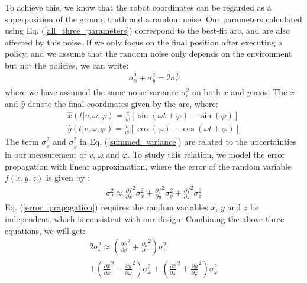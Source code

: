 To achieve this, we know that the robot coordinates can be regarded as a superposition of the ground truth and a random noise.
Our parameters calculated using Eq. (\ref{all_three_parameters}) correspond to the best-fit arc, and are also affected by this noise.
If we only focus on the final position after executing a policy, and we assume that the random noise only depends on the environment but not the policies, we can write:
%
\begin{equation}
\begin{gathered}
\sigma_{\hat{x}}^2 + \sigma_{\hat{y}}^2 = 2 \sigma_{\epsilon}^2
\end{gathered}
\label{summed_variance}
\end{equation}
%
where we have assumed the same noise variance $\sigma_{\epsilon}^2$ on both $x$ and $y$ axis.
The $\hat{x}$ and $\hat{y}$ denote the final coordinates given by the arc, where:
\begin{equation}
\begin{gathered}
\hat{x}(t | v, \omega, \varphi) 
= \frac{v}{w} \left[ \sin(\omega t + \varphi) - \sin(\varphi) \right]
\\
\hat{y}(t | v, \omega, \varphi) 
= \frac{v}{w} \left[ \cos(\varphi) - \cos(\omega t + \varphi) \right]
\end{gathered}
\label{position_from_arc}
\end{equation}
%
The term $\sigma_{\hat{x}}^2$ and $\sigma_{\hat{y}}^2$ in Eq. (\ref{summed_variance}) are related to the uncertainties in our measurement of $v$, $\omega$ and $\varphi$.
To study this relation, we model the error propagation with linear approximation, where the error of the random variable $f(x, y, z)$ is given by \cite{error_analysis}:
\begin{equation}
\begin{gathered}
\sigma_f^2 \approx
\frac{\partial f}{\partial x}^2 \sigma_x^2
+ \frac{\partial f}{\partial y}^2 \sigma_y^2
+ \frac{\partial f}{\partial z}^2 \sigma_z^2
\end{gathered}
\label{error_prapagation}
\end{equation}
Eq. (\ref{error_prapagation}) requires the random variables $x$, $y$ and $z$ be independent, which is consistent with our design.
Combining the above three equations, we will get:
\begin{equation}
\begin{gathered}
2\sigma_{\epsilon}^2 \approx 
\left(
 \frac{\partial \hat{x}}{\partial v}^2
 + \frac{\partial \hat{y}}{\partial v}^2
\right) \sigma_v^2 
\\ +
\left(
\frac{\partial \hat{x}}{\partial \omega}^2
+
\frac{\partial \hat{y}}{\partial \omega}^2
\right) \sigma_{\omega}^2 
 +
\left(
\frac{\partial \hat{x}}{\partial \varphi}^2
+ 
\frac{\partial \hat{y}}{\partial \varphi}^2
\right) \sigma_{\varphi}^2
\end{gathered}
\label{combined_error_relation}
\end{equation}
